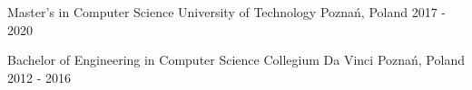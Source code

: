 

\begin{cventries}

  \cventry
    {Master’s in Computer Science} %
    {University of Technology} %
    {Poznań, Poland} %
    {2017 - 2020} %
    {
      \begin{cvitems} %
      \end{cvitems}
    }

  \cventry
    {Bachelor of Engineering in Computer Science} %
    {Collegium Da Vinci} %
    {Poznań, Poland} %
    {2012 - 2016} %
    {
      \begin{cvitems} %
      \end{cvitems}
    }

\end{cventries}
